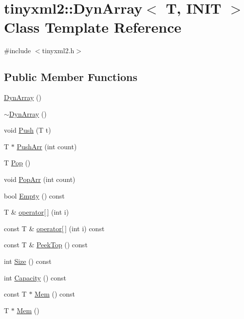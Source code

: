 \hypertarget{classtinyxml2_1_1_dyn_array}{\section{tinyxml2\-:\-:Dyn\-Array$<$ T, I\-N\-I\-T $>$ Class Template Reference}
\label{classtinyxml2_1_1_dyn_array}
}


{\ttfamily \#include $<$tinyxml2.\-h$>$}

\subsection*{Public Member Functions}
\begin{DoxyCompactItemize}
\item 
\hyperlink{classtinyxml2_1_1_dyn_array_af076df9203a7eda3f3501a0c84dbbb8a}{Dyn\-Array} ()
\item 
\hyperlink{classtinyxml2_1_1_dyn_array_ac7c2dc82db9010d09041ea6bfd921fdc}{$\sim$\-Dyn\-Array} ()
\item 
void \hyperlink{classtinyxml2_1_1_dyn_array_a498de53808ba0151fef54ea10bf51050}{Push} (T t)
\item 
T $\ast$ \hyperlink{classtinyxml2_1_1_dyn_array_aa3c360d40addc3b05121da9f60a01b4d}{Push\-Arr} (int count)
\item 
T \hyperlink{classtinyxml2_1_1_dyn_array_a2281e3342bc235bf391a67e362c75866}{Pop} ()
\item 
void \hyperlink{classtinyxml2_1_1_dyn_array_ab45c0836d8c0260a5b9eda7da80de71c}{Pop\-Arr} (int count)
\item 
bool \hyperlink{classtinyxml2_1_1_dyn_array_a080dc4dc68713964bb17745d4c833158}{Empty} () const 
\item 
T \& \hyperlink{classtinyxml2_1_1_dyn_array_a775a6ab4d41f0eb15bdd863d408dd58f}{operator\mbox{[}$\,$\mbox{]}} (int i)
\item 
const T \& \hyperlink{classtinyxml2_1_1_dyn_array_a1f4874c2608cbd68be1627fca9efd820}{operator\mbox{[}$\,$\mbox{]}} (int i) const 
\item 
const T \& \hyperlink{classtinyxml2_1_1_dyn_array_a9c2282ea8901b5a92ccaac2e6166a788}{Peek\-Top} () const 
\item 
int \hyperlink{classtinyxml2_1_1_dyn_array_a1299b257b62ea6b4983c488867f219b0}{Size} () const 
\item 
int \hyperlink{classtinyxml2_1_1_dyn_array_a8edbe90ed53b2e46b1b5cf53b261e4e7}{Capacity} () const 
\item 
const T $\ast$ \hyperlink{classtinyxml2_1_1_dyn_array_a1f39330daeb97d3d1dc3fc12dcf7ac67}{Mem} () const 
\item 
T $\ast$ \hyperlink{classtinyxml2_1_1_dyn_array_a0e0d60b399d54fad5b33d5008bc59c8e}{Mem} ()
\end{DoxyCompactItemize}


